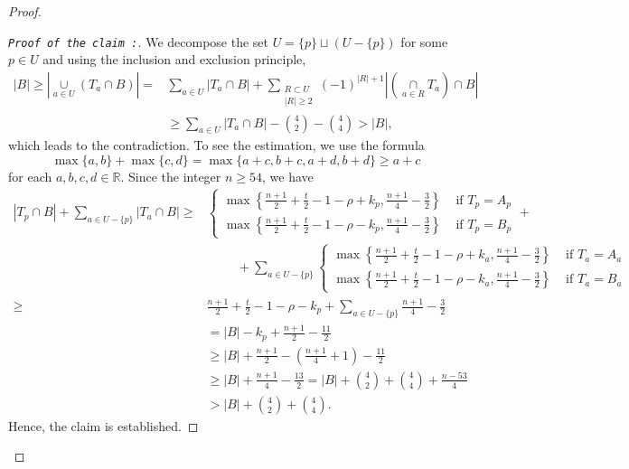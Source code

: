 \documentclass[reqno,10pt]{amsart}
\theoremstyle{definition}
\begin{document}
\begin{proof}
\begin{proof}[\tt{Proof of the claim} :]
We decompose the set $U=\{p\}\sqcup(U-\{p\})$ for some $p\in U$ and using the inclusion and exclusion principle,
\begin{align*}
|B|\geq|\underset{a\in U}{\cup}(T_{a}\cap B)|=&\underset{a\in U}{\sum}|T_{a}\cap B|+\underset{\substack{R\subset U\\|R|\geq2}}{\sum}(-1)^{|R|+1}\left|\left(\underset{a\in R}{\cap}T_{a}\right)\cap B\right|\\ 
&\geq\underset{a\in U}{\sum}|T_{a}\cap B|-\binom{4}{2}-\binom{4}{4}>|B|,
\end{align*}
which leads to the contradiction. To see the estimation, we use the formula 
\begin{equation*}
\max\{a,b\}+\max\{c,d\}=\max\{a+c,b+c,a+d,b+d\}\geq a+c    
\end{equation*}
for each $a,b,c,d\in\mathbb{R}$. Since the integer $n\geq54$, we have
\begin{align*}
|T_{p}\cap B|+\underset{a\in U-\{p\}}{\sum}|T_{a}\cap B|\geq&\begin{cases}
		\max \left\{\frac{n+1}{2}+\frac{t}{2}-1-\rho+k_{p}, \frac{n+1}{4}-\frac{3}{2}\right\}&\text{ if } T_{p}=A_{p}\\
		\max \left\{\frac{n+1}{2}+\frac{t}{2}-1-\rho-k_{p}, \frac{n+1}{4}-\frac{3}{2}\right\}&\text{ if } T_{p}=B_{p}
 \end{cases}+\\
 &\hspace{1cm}+\underset{a\in U-\{p\}}{\sum}\begin{cases}
		\max \left\{\frac{n+1}{2}+\frac{t}{2}-1-\rho+k_{a}, \frac{n+1}{4}-\frac{3}{2}\right\}&\text{ if } T_{a}=A_{a}\\
		\max \left\{\frac{n+1}{2}+\frac{t}{2}-1-\rho-k_{a}, \frac{n+1}{4}-\frac{3}{2}\right\}&\text{ if } T_{a}=B_{a}
\end{cases}\\
 \geq&\frac{n+1}{2}+\frac{t}{2}-1-\rho-k_{p}+\underset{a\in U-\{p\}}{\sum}\frac{n+1}{4}-\frac{3}{2}\\
 &=|B|-k_{p}+\frac{n+1}{2}-\frac{11}{2}\\
 &\geq|B|+\frac{n+1}{2}-\left(\frac{n+1}{4}+1\right)-\frac{11}{2}\\
 &\geq|B|+\frac{n+1}{4}-\frac{13}{2}=|B|+\binom{4}{2}+\binom{4}{4}+\frac{n-53}{4}\\
 &>|B|+\binom{4}{2}+\binom{4}{4}.
\end{align*}
Hence, the claim is established.
\end{proof}


\end{proof}
\end{document}
